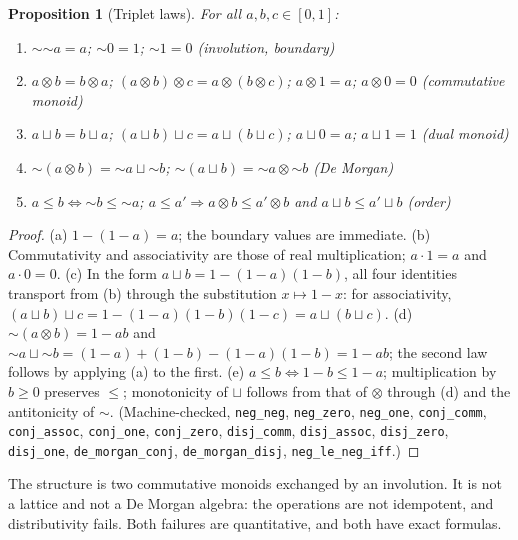 \documentclass[11pt,a4paper]{article}
\newtheorem{proposition}[theorem]{Proposition}
\newcommand{\negc}{\mathord{\sim}}
\newcommand{\conjc}{\otimes}
\newcommand{\disjc}{\sqcup}
\begin{document}
\begin{proposition}[Triplet laws]
\label{prop:laws}
For all $a, b, c \in [0,1]$:
\begin{enumerate}[label=(\alph*),nosep]
\item $\negc\negc a = a$; \quad $\negc 0 = 1$; \quad $\negc 1 = 0$
  \hfill (involution, boundary)
\item $a \conjc b = b \conjc a$; \quad
  $(a \conjc b) \conjc c = a \conjc (b \conjc c)$; \quad
  $a \conjc 1 = a$; \quad $a \conjc 0 = 0$
  \hfill (commutative monoid)
\item $a \disjc b = b \disjc a$; \quad
  $(a \disjc b) \disjc c = a \disjc (b \disjc c)$; \quad
  $a \disjc 0 = a$; \quad $a \disjc 1 = 1$
  \hfill (dual monoid)
\item $\negc(a \conjc b) = \negc a \disjc \negc b$; \quad
  $\negc(a \disjc b) = \negc a \conjc \negc b$
  \hfill (De Morgan)
\item $a \leq b \iff \negc b \leq \negc a$; \quad
  $a \leq a' \Rightarrow a \conjc b \leq a' \conjc b$
  and $a \disjc b \leq a' \disjc b$
  \hfill (order)
\end{enumerate}
\end{proposition}

\begin{proof}
(a) $1 - (1 - a) = a$; the boundary values are immediate.
(b) Commutativity and associativity are those of real
multiplication; $a \cdot 1 = a$ and $a \cdot 0 = 0$.
(c) In the form $a \disjc b = 1 - (1-a)(1-b)$, all four identities
transport from (b) through the substitution $x \mapsto 1 - x$:
for associativity,
$(a \disjc b) \disjc c = 1 - (1-a)(1-b)(1-c) = a \disjc (b \disjc c)$.
(d) $\negc(a \conjc b) = 1 - ab$ and
$\negc a \disjc \negc b = (1-a) + (1-b) - (1-a)(1-b) = 1 - ab$;
the second law follows by applying (a) to the first.
(e) $a \leq b \iff 1 - b \leq 1 - a$; multiplication by $b \geq 0$
preserves $\leq$; monotonicity of $\disjc$ follows from that of
$\conjc$ through (d) and the antitonicity of $\negc$.
(Machine-checked, \texttt{neg\_neg}, \texttt{neg\_zero},
\texttt{neg\_one}, \texttt{conj\_comm}, \texttt{conj\_assoc},
\texttt{conj\_one}, \texttt{conj\_zero}, \texttt{disj\_comm},
\texttt{disj\_assoc}, \texttt{disj\_zero}, \texttt{disj\_one},
\texttt{de\_morgan\_conj}, \texttt{de\_morgan\_disj},
\texttt{neg\_le\_neg\_iff}.)
\end{proof}

The structure is two commutative monoids exchanged by an involution.
It is not a lattice and not a De Morgan algebra: the operations are
not idempotent, and distributivity fails.
Both failures are quantitative, and both have exact formulas.
\end{document}
